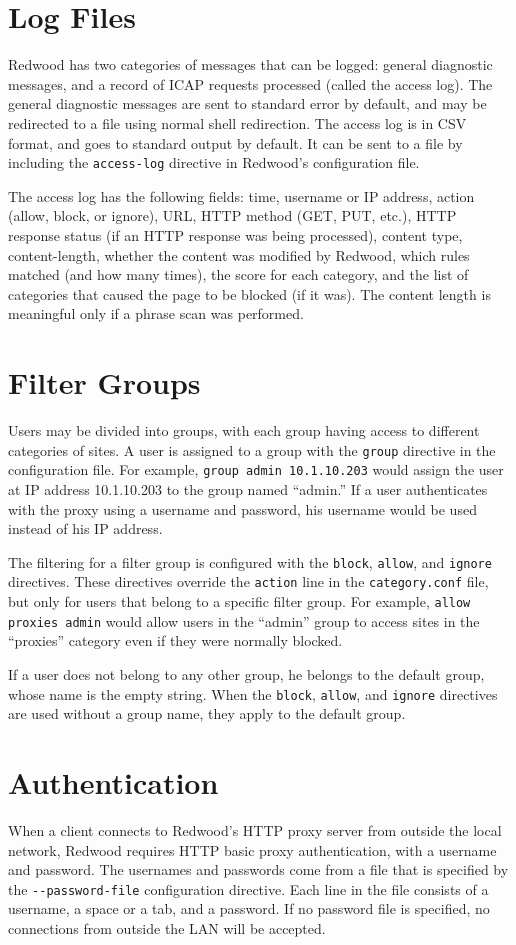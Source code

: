\documentclass{article}
\begin{document}
\section{Log Files}

Redwood has two categories of messages that can be logged:
general diagnostic messages, and a record of ICAP requests processed (called the access log).
The general diagnostic messages are sent to standard error by default,
and may be redirected to a file using normal shell redirection.
The access log is in CSV format, 
and goes to standard output by default.
It can be sent to a file by including the \verb"access-log" directive in Redwood's configuration file.

The access log has the following fields: time, username or IP address, 
action (allow, block, or ignore), URL, HTTP method (GET, PUT, etc.),
HTTP response status (if an HTTP response was being processed), 
content type, content-length, whether the content was modified by Redwood, which rules matched (and how many times), 
the score for each category, and the list of categories that caused the page to be blocked (if it was).
The content length is meaningful only if a phrase scan was performed.

\section{Filter Groups}

Users may be divided into groups, with each group having access to different categories of sites.
A user is assigned to a group with the \verb"group" directive in the configuration file.
For example, \verb"group admin 10.1.10.203" would assign the user at IP address 10.1.10.203
to the group named ``admin.'' 
If a user authenticates with the proxy using a username and password, 
his username would be used instead of his IP address.

The filtering for a filter group is configured with the \verb"block", \verb"allow", and \verb"ignore"
directives. These directives override the \verb"action" line in the \verb"category.conf" file,
but only for users that belong to a specific filter group.
For example, \verb"allow proxies admin" would allow users in the ``admin'' group
to access sites in the ``proxies'' category even if they were normally blocked.

If a user does not belong to any other group, he belongs to the default group,
whose name is the empty string.
When the \verb"block", \verb"allow", and \verb"ignore" directives are used without a group name,
they apply to the default group.

\section{Authentication}

When a client connects to Redwood's HTTP proxy server from outside the local network,
Redwood requires HTTP basic proxy authentication, with a username and password.
The usernames and passwords come from a file that is specified by the \verb"--password-file"
configuration directive. Each line in the file consists of a username,
a space or a tab, and a password.
If no password file is specified, no connections from outside the LAN will be accepted.
\end{document}
